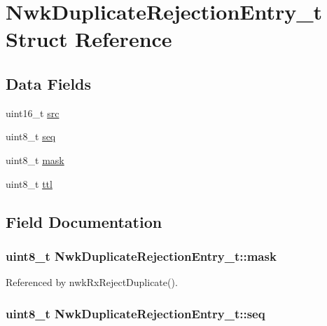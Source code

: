 \hypertarget{struct_nwk_duplicate_rejection_entry__t}{\section{Nwk\-Duplicate\-Rejection\-Entry\-\_\-t Struct Reference}
\label{struct_nwk_duplicate_rejection_entry__t}
}
\subsection*{Data Fields}
\begin{DoxyCompactItemize}
\item 
uint16\-\_\-t \hyperlink{struct_nwk_duplicate_rejection_entry__t_a63239398cdce980e8fdb8ddcc3b355e4}{src}
\item 
uint8\-\_\-t \hyperlink{struct_nwk_duplicate_rejection_entry__t_a649ba3105d449ddee353a4cd71ca4b98}{seq}
\item 
uint8\-\_\-t \hyperlink{struct_nwk_duplicate_rejection_entry__t_a32116eb1ba1e35166a97910698ef68bd}{mask}
\item 
uint8\-\_\-t \hyperlink{struct_nwk_duplicate_rejection_entry__t_a05c493a205d4e7c456c7e6da52fa4f34}{ttl}
\end{DoxyCompactItemize}


\subsection{Field Documentation}
\hypertarget{struct_nwk_duplicate_rejection_entry__t_a32116eb1ba1e35166a97910698ef68bd}{
\subsubsection[{mask}]{\setlength{\rightskip}{0pt plus 5cm}uint8\-\_\-t Nwk\-Duplicate\-Rejection\-Entry\-\_\-t\-::mask}}\label{struct_nwk_duplicate_rejection_entry__t_a32116eb1ba1e35166a97910698ef68bd}


Referenced by nwk\-Rx\-Reject\-Duplicate().

\hypertarget{struct_nwk_duplicate_rejection_entry__t_a649ba3105d449ddee353a4cd71ca4b98}{
\subsubsection[{seq}]{\setlength{\rightskip}{0pt plus 5cm}uint8\-\_\-t Nwk\-Duplicate\-Rejection\-Entry\-\_\-t\-::seq}}\label{struct_nwk_duplicate_rejection_entry__t_a649ba3105d449ddee353a4cd71ca4b98}


